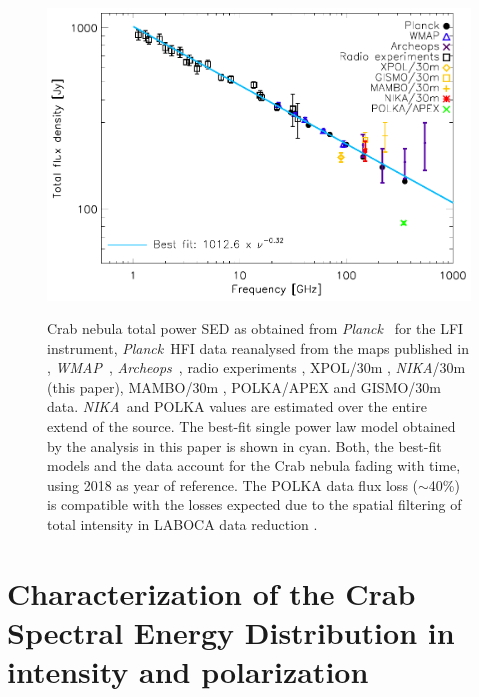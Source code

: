 \documentclass[twocolumn,traditabstract]{aa}
\def\NIKA{\textit{NIKA}}
\def\Archeops{\textit{Archeops}}
\def\Planck{\textit{Planck}}
\def\WMAP{\textit{WMAP}}
\begin{document}
\begin{figure}
  \centering
          { \includegraphics[width=1\linewidth,keepaspectratio]{figures/Crab_SED_int.pdf}}
           \caption{Crab nebula total power SED as obtained from \Planck\ \citep{2015arXiv150702058P} for the LFI instrument, \Planck\ HFI data reanalysed from the maps published in \cite{refId0}, \WMAP\ \citep{2011ApJS..192...19W}, \Archeops\ \citep{macias2007archeops}, radio experiments \citep{dmitrenko1970absolute, 1971IzVUZ..14..157V}, XPOL/30m \citep{aumont2010}, \NIKA/30m (this paper), MAMBO/30m \citep{2002A&A...386.1044B}, POLKA/APEX \citep{2014PASP..126.1027W} and GISMO/30m \citep{2011ApJ...734...54A} data. \NIKA\ and POLKA values are estimated over the entire extend of the source. The best-fit single power law model obtained by the analysis in this paper is shown in cyan. Both, the best-fit models and the data account for the Crab nebula fading with time, using 2018 as year of reference. The POLKA data flux loss ($\sim$40\%) is compatible with the losses expected due to the spatial filtering of total intensity in LABOCA data reduction \citep{2011A&A...527A.145B}.}
\label{crab_SED}		
  \end{figure} 

\section{Characterization of the Crab Spectral Energy Distribution in intensity and polarization}\label{sec:Polarization intensity Spectral Energy Density (SED)}
\end{document}
